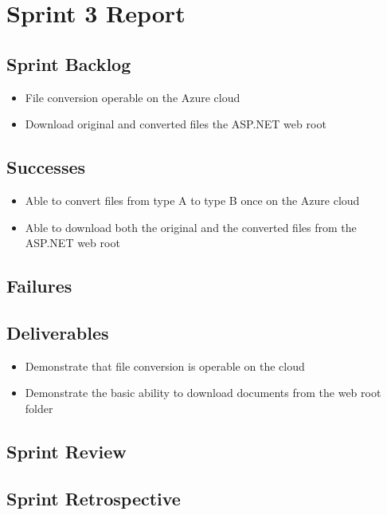 
\section{Sprint 3 Report}
\label{sec:Sprint3_report}
    \subsection{Sprint Backlog}
    \label{sec:Sprint3_backlog}
        \begin{itemize}
            \item File conversion operable on the Azure cloud
            \item Download original and converted files the ASP.NET web root
        \end{itemize}

    \subsection{Successes}
    \label{sec:Sprint3_successes}
        \begin{itemize}
            \item Able to convert files from type A to type B once on the Azure cloud
            \item Able to download both the original and the converted files from the ASP.NET web root
        \end{itemize}

    \subsection{Failures}
    \label{sec:Sprint3_failures}

    \subsection{Deliverables}
    \label{sec:Sprint3_deliverables}
    \begin{itemize}
        \item Demonstrate that file conversion is operable on the cloud
        \item Demonstrate the basic ability to download documents from the web root folder
    \end{itemize}

    \subsection{Sprint Review}
    \label{sec:Sprint3_review}

    \subsection{Sprint Retrospective}
    \label{sec:Sprint3_retrospective}
